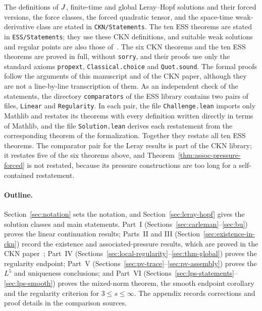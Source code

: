 \documentclass[11pt,letterpaper]{article}
\numberwithin{equation}{section}
\theoremstyle{plain}
\theoremstyle{definition}
\theoremstyle{remark}
\begin{document}
The definitions of $J$, finite-time and global Leray--Hopf solutions and their forced versions, the force classes, the forced quadratic tensor, and the space-time weak-derivative class are stated in \texttt{CKN/Statements}. The ten ESS theorems are stated in \texttt{ESS/Statements}; they use these CKN definitions, and suitable weak solutions and regular points are also those of~\cite{CKNLean}. The six CKN theorems and the ten ESS theorems are proved in full, without \texttt{sorry}, and their proofs use only the standard axioms \texttt{propext}, \texttt{Classical.choice} and \texttt{Quot.sound}. The formal proofs follow the arguments of this manuscript and of the CKN paper, although they are not a line-by-line transcription of them. As an independent check of the statements, the directory \texttt{comparators} of the ESS library contains two pairs of files, \texttt{Linear} and \texttt{Regularity}. In each pair, the file \texttt{Challenge.lean} imports only Mathlib and restates its theorems with every definition written directly in terms of Mathlib, and the file \texttt{Solution.lean} derives each restatement from the corresponding theorem of the formalization. Together they restate all ten ESS theorems. The comparator pair for the Leray results is part of the CKN library; it restates five of the six theorems above, and Theorem~\ref{thm:assoc-pressure-forced} is not restated, because its pressure constructions are too long for a self-contained restatement.

\paragraph{Outline.}
Section~\ref{sec:notation} sets the notation, and Section~\ref{sec:leray-hopf} gives the solution classes and main statements. Part~I (Sections~\ref{sec:carleman}--\ref{sec:bu}) proves the linear continuation results; Parts~II and III (Section~\ref{sec:existence-in-ckn}) record the existence and associated-pressure results, which are proved in the CKN paper~\cite{CKNLean}; Part~IV (Sections~\ref{sec:local-regularity}--\ref{sec:thm-global}) proves the regularity endpoint; Part~V (Sections~\ref{sec:pv-trace}--\ref{sec:pv-assembly}) proves the $L^5$ and uniqueness conclusions; and Part~VI (Sections~\ref{sec:lps-statements}--\ref{sec:lps-smooth}) proves the mixed-norm theorem, the smooth endpoint corollary and the regularity criterion for $3\le s\le\infty$. The appendix records corrections and proof details in the comparison sources.

\end{document}
